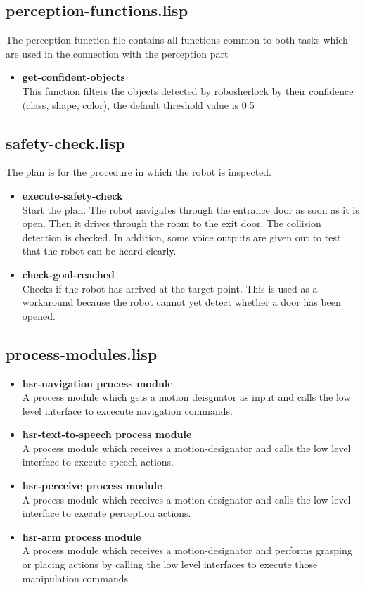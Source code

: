 \documentclass[main.tex]{subfiles}
\begin{document}
	    \subsection{perception-functions.lisp}
	    The perception function file contains all functions common to both tasks which are used in the connection with the perception part
	    \begin{itemize}
	    	\item \textbf{get-confident-objects} \\
	    	This function filters the objects detected by robosherlock by their confidence (class, shape, color), the default threshold value is 0.5
	    \end{itemize}
	    \subsection{safety-check.lisp}
	    The plan is for the procedure in which the robot is inspected. 
	    \begin{itemize}
	    	\item \textbf{execute-safety-check} \\
	    	Start the plan. The robot navigates through the entrance door as soon as it is open. Then it drives through the room to the exit door. The collision detection is checked. In addition, some voice outputs are given out to test that the robot can be heard clearly.
	    	\item \textbf{check-goal-reached}\\
	    	Checks if the robot has arrived at the target point. This is used as a workaround because the robot cannot yet detect whether a door has been opened.
	    \end{itemize}
	    \subsection{process-modules.lisp}
	     \begin{itemize}
	    	\item \textbf{hsr-navigation process module} \\
		A process module which gets a motion deisgnator as input and calls the low level interface to excecute navigation commands.
		\item \textbf{hsr-text-to-speech process module} \\
		A process module which receives a motion-designator and calls the low level interface to exceute speech actions.
		\item \textbf{hsr-perceive process module} \\
		A process module which receives a motion-designator and calls the low level interface to execute perception actions.
		\item\textbf{hsr-arm process module} \\
		A process module which receives a motion-designator and performs grasping or placing actions by calling the low level interfaces to execute those manipulation commands 
	    \end{itemize}
\end{document}
